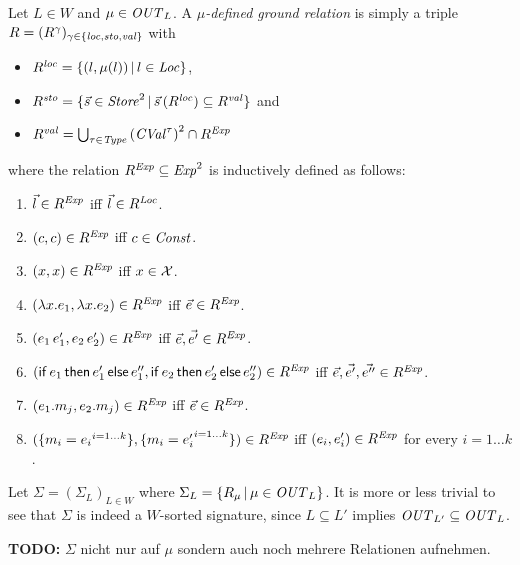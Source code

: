 \documentclass[12pt,a4paper]{report}
\newcommand{\CVal}{\nstyle{CVal}}
\newcommand{\loc}{\nstyle{loc}}
\newcommand{\sto}{\nstyle{sto}}
\newcommand{\val}{\nstyle{val}}
\newcommand{\OUT}{\nstyle{OUT}}
\begin{document}
\begin{definition}
  Let $L\in W$ and $\mu \in \OUT_L$. A {\em $\mu$-defined ground relation} is simply a
  triple $R = (R^\gamma)_{\gamma\in\{\loc,\sto,\val\}}$ with
  \begin{itemize}
    \item $R^\loc = \{ (l,\mu(l))\,|\,l\in \Loc\}$,
    \item $R^\sto = \{ \vec{s}\in\Store^2\,|\,\vec{s}\,(R^\loc)\subseteq R^\val\}$ and
    \item $R^\val = \bigcup_{\tau\in\Type} \left(\CVal^\tau\right)^2 \cap R^\Exp$
  \end{itemize}
  where the relation $R^{\mathit{Exp}} \subseteq \mathit{Exp}^2$ is inductively defined as follows:
  \begin{enumerate}
    \item $\vec{l}\in R^{\mathit{Exp}}$ iff $\vec{l}\in R^{\mathit{Loc}}$.
    \item $(c,c)\in R^{\mathit{Exp}}$ iff $c\in\mathit{Const}$.
    \item $(x,x)\in R^{\mathit{Exp}}$ iff $x\in\mathcal{X}$.
    \item $(\lambda x.e_1,\lambda x.e_2)\in R^{\mathit{Exp}}$ iff $\vec{e}\in R^{\mathit{Exp}}$.
    \item $(e_1\,e_1',e_2\,e_2')\in R^{\mathit{Exp}}$ iff $\vec{e},\vec{e'}\in R^{\mathit{Exp}}$.
    \item $(\mathsf{if}\,e_1\,\mathsf{then}\,e_1'\,\mathsf{else}\,e_1'',\mathsf{if}\,e_2\,\mathsf{then}\,e_2'\,\mathsf{else}\,e_2'')\in R^{\mathit{Exp}}$ iff
          $\vec{e},\vec{e'},\vec{e''}\in R^{\mathit{Exp}}$.
    \item $(e_1.m_j,e_2.m_j)\in R^{\mathit{Exp}}$ iff $\vec{e}\in R^{\mathit{Exp}}$.
    \item $(\{{m_i=e_i}^{i=1 \ldots k}\},\{{m_i=e_i'}^{i=1 \ldots k}\})\in R^{\mathit{Exp}}$ iff
            $(e_i,e_i')\in R^{\mathit{Exp}}$ for every $i=1 \ldots k$.
  \end{enumerate}
\end{definition}

Let $\Sigma = (\Sigma_L)_{L\in W}$ where $\Sigma_L = \{R_\mu\,|\,\mu\in\OUT_L\}$. It is more or less trivial to see
that $\Sigma$ is indeed a $W$-sorted signature, since $L \subseteq L'$ implies $\OUT_{L'}\subseteq\OUT_L$.

{\bf TODO:} $\Sigma$ nicht nur auf $\mu$ sondern auch noch mehrere Relationen aufnehmen.
\end{document}
